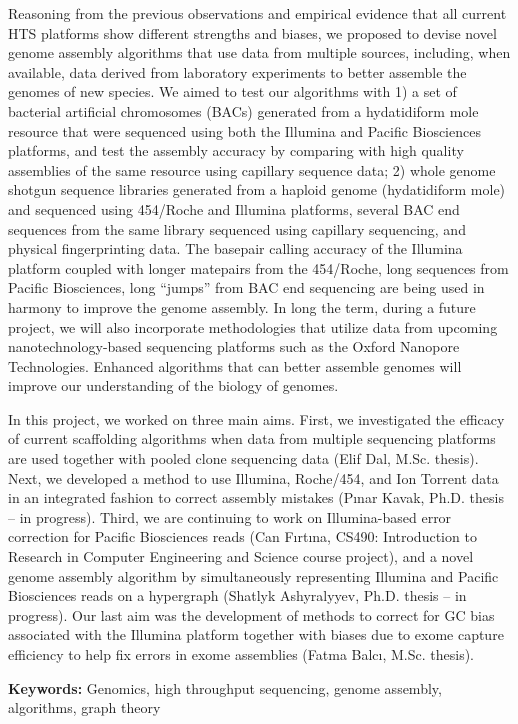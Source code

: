 \documentclass[11pt]{article}
\begin{document}
Reasoning from the previous observations and empirical evidence that all current HTS platforms show different strengths and biases, we proposed to devise novel genome assembly algorithms that use data from multiple sources, including, when available, data derived from laboratory experiments to better assemble the genomes of new species. We aimed to test our algorithms with 1) a set of bacterial artificial chromosomes (BACs) generated from a hydatidiform mole resource that were sequenced using both the Illumina and Pacific Biosciences platforms, and test the assembly accuracy by comparing with high quality assemblies of the same resource using capillary sequence data; 2) whole genome shotgun sequence libraries generated from a haploid genome (hydatidiform mole) and sequenced using 454/Roche and Illumina platforms, several BAC end sequences from the same library sequenced using capillary sequencing, and physical fingerprinting data. The basepair calling accuracy of the Illumina platform coupled with longer matepairs from the 454/Roche, long sequences from Pacific Biosciences, long ``jumps'' from BAC end sequencing are being used in harmony to improve the genome assembly. In long the term, during a future project, we will also incorporate methodologies that utilize data from upcoming nanotechnology-based sequencing platforms such as the Oxford Nanopore Technologies. Enhanced algorithms that can better assemble genomes will improve our understanding of the biology of genomes.

In this project, we worked on three main aims. First, 
we investigated the efficacy  of current scaffolding algorithms when data from multiple sequencing platforms are used together with pooled clone sequencing data (Elif Dal, M.Sc. thesis). 
Next, we developed a method to use Illumina, Roche/454, and Ion Torrent data in an integrated fashion to correct assembly mistakes (Pınar Kavak, Ph.D. thesis -- in progress).
Third, we are continuing to work on Illumina-based error correction for Pacific Biosciences reads (Can Fırtına, CS490:  Introduction to Research in Computer Engineering and Science course project), and a novel genome assembly algorithm by simultaneously representing Illumina and Pacific Biosciences reads on a hypergraph (Shatlyk Ashyralyyev, Ph.D. thesis -- in progress). Our last aim was the development of methods to correct for GC bias associated with the Illumina platform together with biases due to exome capture efficiency to help fix errors in exome assemblies (Fatma Balcı, M.Sc. thesis). 

{\bf Keywords:} Genomics, high throughput sequencing, genome assembly, algorithms, graph theory
\end{document}
